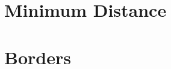 \documentclass[10pt]{article}
\begin{document}
\clearpage\section{Minimum Distance}








\clearpage\section{Borders}






\end{document}
